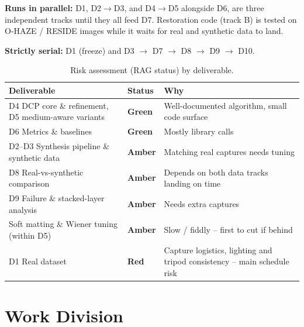 \documentclass[12pt,a4paper]{article}
\begin{document}
\textbf{Runs in parallel:} D1, D2$\rightarrow$D3, and D4$\rightarrow$D5
alongside D6, are three independent tracks until they all feed D7.
Restoration code (track B) is tested on O-HAZE / RESIDE images while it
waits for real and synthetic data to land.

\textbf{Strictly serial:} D1 (freeze) and D3 $\rightarrow$ D7
$\rightarrow$ D8 $\rightarrow$ D9 $\rightarrow$ D10.

\begin{table}[H]
\centering
\normalsize
\begin{tabular}{@{}p{5.5cm}p{1.6cm}p{7.3cm}@{}}
\toprule
Deliverable & Status & Why \\
\midrule
D4 DCP core \& refinement, D5 medium-aware variants & \textbf{Green} &
  Well-documented algorithm, small code surface \\
D6 Metrics \& baselines & \textbf{Green} & Mostly library calls \\
D2--D3 Synthesis pipeline \& synthetic data & \textbf{Amber} &
  Matching real captures needs tuning \\
D8 Real-vs-synthetic comparison & \textbf{Amber} &
  Depends on both data tracks landing on time \\
D9 Failure \& stacked-layer analysis & \textbf{Amber} & Needs extra captures \\
Soft matting \& Wiener tuning (within D5) & \textbf{Amber} &
  Slow / fiddly -- first to cut if behind \\
D1 Real dataset & \textbf{Red} &
  Capture logistics, lighting and tripod consistency -- main schedule risk \\
\bottomrule
\end{tabular}
\caption{Risk assessment (RAG status) by deliverable.}
\label{tab:rag}
\end{table}

\section{Work Division}
\label{sec:work}
\end{document}
